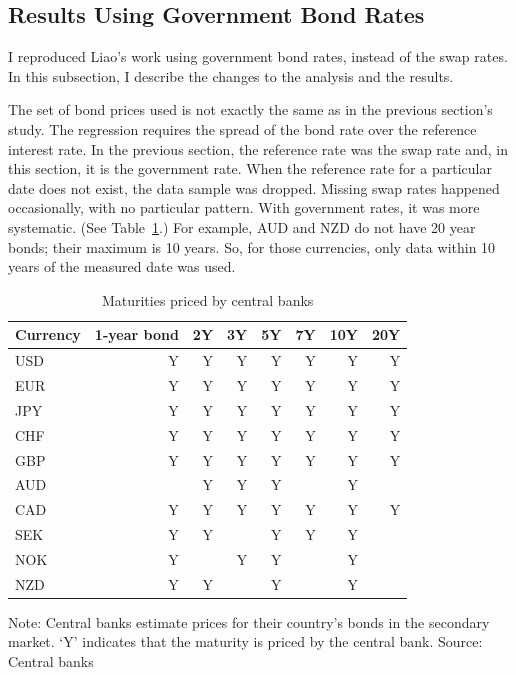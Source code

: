 \subsection{Results Using Government Bond Rates}

I reproduced Liao's work using government bond rates, instead of the swap rates.  In this subsection, I describe the changes to the analysis and the results.


The set of bond prices used is not exactly the same as in the previous section's study.  The regression requires the spread of the bond rate over the reference interest rate.  In the previous section, the reference rate was the swap rate and, in this section, it is the government rate.  When the reference rate for a particular date does not exist, the data sample was dropped.  Missing swap rates happened occasionally, with no particular pattern.  With government rates, it was more systematic.  (See Table~\ref{govt_maturities}.)  For example, AUD and NZD do not have 20 year bonds; their maximum is 10 years.  So, for those currencies, only data within 10 years of the measured date was used.

\begin{table}[H]
\caption{\label{govt_maturities} Maturities priced by central banks
}
\centering
\begin{tabular}{ |l|r|r|r|r|r|r|r| }
\hline
Currency & 1-year bond & 2Y & 3Y & 5Y & 7Y & 10Y & 20Y \\
\hline
USD & Y & Y & Y & Y & Y & Y & Y \\  
EUR & Y & Y & Y & Y & Y & Y & Y \\  
JPY & Y & Y & Y & Y & Y & Y & Y \\ 
CHF & Y & Y & Y & Y & Y & Y & Y \\ 
GBP & Y & Y & Y & Y & Y & Y & Y \\ 
AUD &   & Y & Y & Y &   & Y &   \\ 
CAD & Y & Y & Y & Y & Y & Y & Y \\ 
SEK & Y & Y &   & Y & Y & Y &   \\ 
NOK & Y &   & Y & Y &   & Y &   \\ 
NZD & Y & Y &   & Y &   & Y &   \\ 
\hline
\end{tabular}

\raggedright 
 Note: {\small Central banks estimate prices for their country's bonds in the secondary market.  `Y' indicates that the maturity is priced by the central bank.}
\newline Source: Central banks
\end{table}

